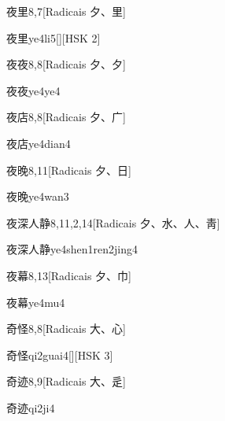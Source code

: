 \begin{entry}{夜里}{8,7}[Radicais ⼣、⾥]
  \begin{phonetics}{夜里}{ye4li5}[][HSK 2]
  \end{phonetics}
\end{entry}

\begin{entry}{夜夜}{8,8}[Radicais ⼣、⼣]
  \begin{phonetics}{夜夜}{ye4ye4}
  \end{phonetics}
\end{entry}

\begin{entry}{夜店}{8,8}[Radicais ⼣、⼴]
  \begin{phonetics}{夜店}{ye4dian4}
  \end{phonetics}
\end{entry}

\begin{entry}{夜晚}{8,11}[Radicais ⼣、⽇]
  \begin{phonetics}{夜晚}{ye4wan3}
  \end{phonetics}
\end{entry}

\begin{entry}{夜深人静}{8,11,2,14}[Radicais ⼣、⽔、⼈、⾭]
  \begin{phonetics}{夜深人静}{ye4shen1ren2jing4}
  \end{phonetics}
\end{entry}

\begin{entry}{夜幕}{8,13}[Radicais ⼣、⼱]
  \begin{phonetics}{夜幕}{ye4mu4}
  \end{phonetics}
\end{entry}

\begin{entry}{奇怪}{8,8}[Radicais ⼤、⼼]
  \begin{phonetics}{奇怪}{qi2guai4}[][HSK 3]
  \end{phonetics}
\end{entry}

\begin{entry}{奇迹}{8,9}[Radicais ⼤、⾡]
  \begin{phonetics}{奇迹}{qi2ji4}
  \end{phonetics}
\end{entry}

